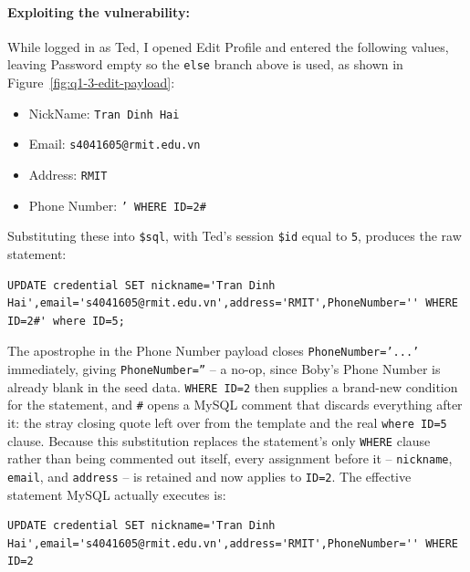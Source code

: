 \paragraph{Exploiting the vulnerability:} While logged in as Ted, I opened
Edit Profile and entered the following values, leaving Password empty so the
\texttt{else} branch above is used, as shown in
Figure~\ref{fig:q1-3-edit-payload}:

\begin{itemize}
  \item NickName: \texttt{Tran Dinh Hai}
  \item Email: \texttt{s4041605@rmit.edu.vn}
  \item Address: \texttt{RMIT}
  \item Phone Number: \texttt{' WHERE ID=2\#}
\end{itemize}


Substituting these into \texttt{\$sql}, with Ted's session \texttt{\$id}
equal to \texttt{5}, produces the raw statement:

\begin{lstlisting}[language={[MySQL]SQL}]
UPDATE credential SET nickname='Tran Dinh Hai',email='s4041605@rmit.edu.vn',address='RMIT',PhoneNumber='' WHERE ID=2#' where ID=5;
\end{lstlisting}

The apostrophe in the Phone Number payload closes \texttt{PhoneNumber='...'}
immediately, giving \texttt{PhoneNumber=''} -- a no-op, since Boby's Phone
Number is already blank in the seed data. \texttt{WHERE ID=2} then supplies
a brand-new condition for the statement, and \texttt{\#} opens a MySQL
comment that discards everything after it: the stray closing quote left over
from the template and the real \texttt{where ID=5} clause. Because this
substitution replaces the statement's only \texttt{WHERE} clause rather than
being commented out itself, every assignment before it -- \texttt{nickname},
\texttt{email}, and \texttt{address} -- is retained and now applies to
\texttt{ID=2}. The effective statement MySQL actually executes is:

\begin{lstlisting}[language={[MySQL]SQL}]
UPDATE credential SET nickname='Tran Dinh Hai',email='s4041605@rmit.edu.vn',address='RMIT',PhoneNumber='' WHERE ID=2
\end{lstlisting}

